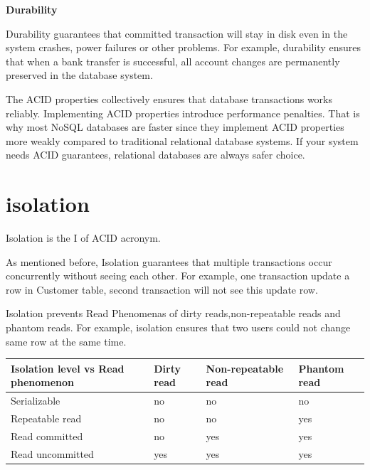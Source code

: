 \documentclass[
  letterpaper,
  DIV=11,
  numbers=noendperiod]{scrreprt}
\begin{document}
\textbf{Durability}

Durability guarantees that committed transaction will stay in disk even
in the system crashes, power failures or other problems. For example,
durability ensures that when a bank transfer is successful, all account
changes are permanently preserved in the database system.

The ACID properties collectively ensures that database transactions
works reliably. Implementing ACID properties introduce performance
penalties. That is why most NoSQL databases are faster since they
implement ACID properties more weakly compared to traditional relational
database systems. If your system needs ACID guarantees, relational
databases are always safer choice.

\chapter{isolation}\label{isolation}

Isolation is the I of ACID acronym.

As mentioned before, Isolation guarantees that multiple transactions
occur concurrently without seeing each other. For example, one
transaction update a row in Customer table, second transaction will not
see this update row.

Isolation prevents Read Phenomenas of dirty reads,non-repeatable reads
and phantom reads. For example, isolation ensures that two users could
not change same row at the same time.

\begin{longtable}[]{@{}
  >{\raggedright\arraybackslash}p{}
  >{\raggedright\arraybackslash}p{}
  >{\raggedright\arraybackslash}p{}
  >{\raggedright\arraybackslash}p{}@{}}
\toprule\noalign{}
\begin{minipage}[b]{\linewidth}\raggedright
Isolation level vs Read phenomenon
\end{minipage} & \begin{minipage}[b]{\linewidth}\raggedright
Dirty read
\end{minipage} & \begin{minipage}[b]{\linewidth}\raggedright
Non-repeatable read
\end{minipage} & \begin{minipage}[b]{\linewidth}\raggedright
Phantom read
\end{minipage} \\
\midrule\noalign{}
\endhead
\bottomrule\noalign{}
\endlastfoot
Serializable & no & no & no \\
Repeatable read & no & no & yes \\
Read committed & no & yes & yes \\
Read uncommitted & yes & yes & yes \\
\end{longtable}
\end{document}
